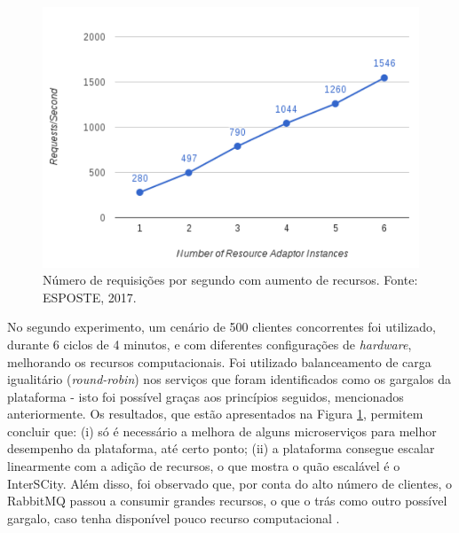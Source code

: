 \begin{apendicesenv}
\begin{figure}
  \centering
    \includegraphics[scale=0.4]{figuras/benchmark2.png}
    \caption{Número de requisições por segundo com aumento de recursos. Fonte: ESPOSTE, 2017.}
  \label{fig:benchmark2}
\end{figure}

No segundo experimento, um cenário de 500 clientes concorrentes foi utilizado, 
durante 6 ciclos de 4 minutos, e com diferentes configurações de
\textit{hardware}, melhorando os recursos computacionais. Foi utilizado
balanceamento de carga igualitário (\textit{round-robin}) nos serviços
que foram identificados como os gargalos da plataforma - isto foi possível
graças aos princípios seguidos, mencionados anteriormente. Os resultados,
que estão apresentados na Figura \ref{fig:benchmark2}, permitem concluir que:
(i) só é necessário a melhora de alguns microserviços para melhor desempenho
da plataforma, até certo ponto; (ii) a plataforma consegue escalar linearmente
com a adição de recursos, o que mostra o quão escalável é o InterSCity. Além
disso, foi observado que, por conta do alto número de clientes, o RabbitMQ
passou a consumir grandes recursos, o que o trás como outro possível gargalo,
caso tenha disponível pouco recurso computacional \cite{delesposte2017}.

\end{apendicesenv}

